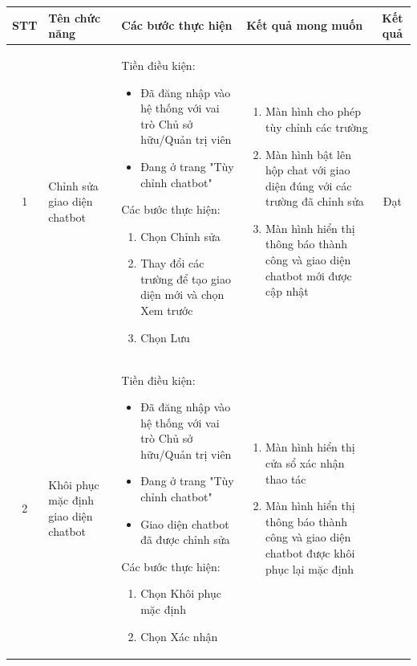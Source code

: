 \newpage
\begin{longtable}{|c|m{2.5cm}|m{5.5cm}|m{4.5cm}|c|}
    \hline
    \textbf{STT} & \textbf{Tên chức năng} & \textbf{Các bước thực hiện} & \textbf{Kết quả mong muốn} & \textbf{Kết quả} \\
    \hline 1 & 
Chỉnh sửa giao diện chatbot & 
Tiền điều kiện:
\begin{itemize}
    \item Đã đăng nhập vào hệ thống với vai trò Chủ sở hữu/Quản trị viên
    \item Đang ở trang "Tùy chỉnh chatbot"
\end{itemize}
Các bước thực hiện: 
\begin{enumerate}[label=\arabic*.]
    \item Chọn Chỉnh sửa
    \item Thay đổi các trường để tạo giao diện mới và chọn Xem trước
    \item Chọn Lưu
\end{enumerate}
& 
\begin{enumerate}[label=\arabic*.]
    \item Màn hình cho phép tùy chỉnh các trường
    \item Màn hình bật lên hộp chat với giao diện đúng với các trường đã chỉnh sửa
    \item Màn hình hiển thị thông báo thành công và giao diện chatbot mới được cập nhật
\end{enumerate}  & Đạt \\
\hline 2 & 
Khôi phục mặc định giao diện chatbot & 
Tiền điều kiện:
\begin{itemize}
    \item Đã đăng nhập vào hệ thống với vai trò Chủ sở hữu/Quản trị viên
    \item Đang ở trang "Tùy chỉnh chatbot"
    \item Giao diện chatbot đã được chỉnh sửa
\end{itemize}
Các bước thực hiện: 
\begin{enumerate}[label=\arabic*.]
    \item Chọn Khôi phục mặc định
    \item Chọn Xác nhận
\end{enumerate}
& 
\begin{enumerate}[label=\arabic*.]
    \item Màn hình hiển thị cửa sổ xác nhận thao tác
    \item Màn hình hiển thị thông báo thành công và giao diện chatbot được khôi phục lại mặc định

\end{enumerate}
\end{longtable}
